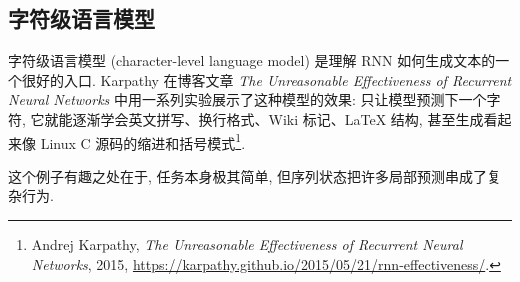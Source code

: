 \documentclass{../nndlcourse}
\begin{document}
\subsection{字符级语言模型}

字符级语言模型 (character-level language model) 是理解 RNN 如何生成文本的一个很好的入口. Karpathy 在博客文章 \textit{The Unreasonable Effectiveness of Recurrent Neural Networks} 中用一系列实验展示了这种模型的效果: 只让模型预测下一个字符, 它就能逐渐学会英文拼写、换行格式、Wiki 标记、LaTeX 结构, 甚至生成看起来像 Linux C 源码的缩进和括号模式\footnote{Andrej Karpathy, \textit{The Unreasonable Effectiveness of Recurrent Neural Networks}, 2015, \url{https://karpathy.github.io/2015/05/21/rnn-effectiveness/}.}.

这个例子有趣之处在于, 任务本身极其简单, 但序列状态把许多局部预测串成了复杂行为.
\end{document}
